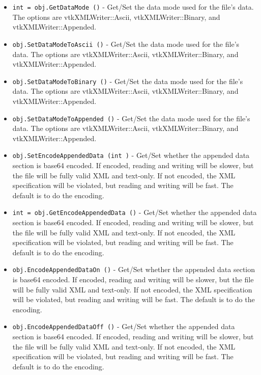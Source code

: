 \begin{itemize}
\item  \verb|int = obj.GetDataMode ()| -  Get/Set the data mode used for the file's data.  The options are
 vtkXMLWriter::Ascii, vtkXMLWriter::Binary, and
 vtkXMLWriter::Appended.

\item  \verb|obj.SetDataModeToAscii ()| -  Get/Set the data mode used for the file's data.  The options are
 vtkXMLWriter::Ascii, vtkXMLWriter::Binary, and
 vtkXMLWriter::Appended.

\item  \verb|obj.SetDataModeToBinary ()| -  Get/Set the data mode used for the file's data.  The options are
 vtkXMLWriter::Ascii, vtkXMLWriter::Binary, and
 vtkXMLWriter::Appended.

\item  \verb|obj.SetDataModeToAppended ()| -  Get/Set the data mode used for the file's data.  The options are
 vtkXMLWriter::Ascii, vtkXMLWriter::Binary, and
 vtkXMLWriter::Appended.

\item  \verb|obj.SetEncodeAppendedData (int )| -  Get/Set whether the appended data section is base64 encoded.  If
 encoded, reading and writing will be slower, but the file will be
 fully valid XML and text-only.  If not encoded, the XML
 specification will be violated, but reading and writing will be
 fast.  The default is to do the encoding.

\item  \verb|int = obj.GetEncodeAppendedData ()| -  Get/Set whether the appended data section is base64 encoded.  If
 encoded, reading and writing will be slower, but the file will be
 fully valid XML and text-only.  If not encoded, the XML
 specification will be violated, but reading and writing will be
 fast.  The default is to do the encoding.

\item  \verb|obj.EncodeAppendedDataOn ()| -  Get/Set whether the appended data section is base64 encoded.  If
 encoded, reading and writing will be slower, but the file will be
 fully valid XML and text-only.  If not encoded, the XML
 specification will be violated, but reading and writing will be
 fast.  The default is to do the encoding.

\item  \verb|obj.EncodeAppendedDataOff ()| -  Get/Set whether the appended data section is base64 encoded.  If
 encoded, reading and writing will be slower, but the file will be
 fully valid XML and text-only.  If not encoded, the XML
 specification will be violated, but reading and writing will be
 fast.  The default is to do the encoding.


\end{itemize}
